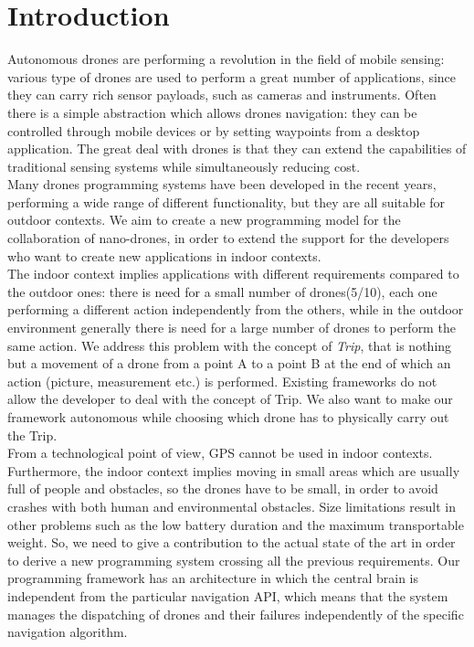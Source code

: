 \chapter{Introduction}
\label{cap1}

Autonomous drones are performing a revolution in the field of mobile sensing: various type of drones are used to perform a great number of applications, since they can carry rich sensor payloads, such as cameras and instruments.
Often there is a simple abstraction which allows drones navigation: they can be controlled through mobile devices or by setting waypoints from a desktop application.
The great deal with drones is that they can extend the capabilities of traditional sensing systems while simultaneously reducing cost.
\\

Many drones programming systems have been developed in the recent years, performing a wide range of different functionality, but they are all suitable for outdoor contexts.
We aim to create a new programming model for the collaboration of nano-drones, in order to extend the support for the developers who want to create new applications in indoor contexts.
\\

The indoor context implies applications with different requirements compared to the outdoor ones:
there is need for a small number of drones(5/10), each one performing a different action independently from the others, while in the outdoor environment generally there is need for a large number of drones to perform the same action.
We address this problem with the concept of \textit{Trip}, that is nothing but a movement of a drone from a point A to a point B at the end of which an action (picture, measurement etc.) is performed.
Existing frameworks do not allow the developer to deal with the concept of Trip.
We also want to make our framework autonomous while choosing which drone has to physically carry out the Trip. 
\\

From a technological point of view, GPS cannot be used in indoor contexts.
Furthermore, the indoor context implies moving in small areas which are usually full of people and obstacles, so the drones have to be small, in order to avoid crashes with both human and environmental obstacles.
Size limitations result in other problems such as the low battery duration and the maximum transportable weight.
So, we need to give a contribution to the actual state of the art in order to derive a new programming system crossing all the previous requirements.
Our programming framework has an architecture in which the central brain is independent from the particular navigation API, which means that the system manages the dispatching of drones and their failures independently of the specific navigation algorithm.


